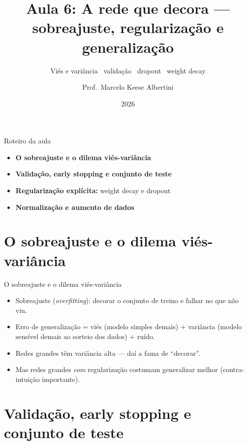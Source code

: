 \documentclass[aspectratio=169, 11pt]{beamer}
\title[Aula 6 — Generalização]{Aula 6: A rede que decora — sobreajuste, regularização e generalização}
\subtitle[GBC073 — Inteligência Computacional]{Viés e variância \textbullet\ validação \textbullet\ dropout \textbullet\ weight decay}
\author[Prof.\ Marcelo Albertini]{Prof.\ Marcelo Keese Albertini}
\institute{GBC073 — Inteligência Computacional \textbullet\ Universidade Federal de Uberlândia}
\date{2026}
\begin{document}
\begin{frame}
  \titlepage
\end{frame}

\begin{frame}{Roteiro da aula}
  \begin{itemize}\setlength{\itemsep}{0.5ex}
    \item<1-> \textbf{O sobreajuste e o dilema viés-variância}
    \item<2-> \textbf{Validação, early stopping e conjunto de teste}
    \item<3-> \textbf{Regularização explícita:} weight decay e dropout
    \item<4-> \textbf{Normalização e aumento de dados}
  \end{itemize}
\end{frame}

\section{O sobreajuste e o dilema viés-variância}

\begin{frame}{O sobreajuste e o dilema viés-variância}
  \begin{itemize}\setlength{\itemsep}{0.4ex}
    \item Sobreajuste (\emph{overfitting}): decorar o conjunto de treino e
          falhar no que não viu.
    \item Erro de generalização = viés (modelo simples demais) + variância
          (modelo sensível demais ao sorteio dos dados) + ruído.
    \item Redes grandes têm variância alta — daí a fama de ``decorar''.
    \item Mas redes grandes \emph{com} regularização costumam generalizar
          melhor (contra-intuição importante).
  \end{itemize}
\end{frame}

\section{Validação, early stopping e conjunto de teste}
\end{document}
